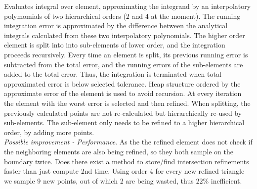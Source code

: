\documentclass[12pt]{article}
\begin{document}
Evaluates integral over element, approximating the integrand by an interpolatory polymomials of two hierarchical orders (2 and 4 at the moment). The running integration error is approximated by the difference between the analytical integrals calculated from these two interpolatory polynomials. The higher order element is split into into sub-elements of lower order, and the integration proceeds recursively. Every time an element is split, its previous running error is subtracted from the total error, and the running errors of the sub-elements are added to the total error. Thus, the integration is terminated when total approximated error is below selected tolerance. Heap structure ordered by the approximate error of the element is used to avoid recursion. At every iteration the element with the worst error is selected and then refined. When splitting, the previously calculated points are not re-calculated but hierarchically re-used by sub-elements. The sub-element only needs to be refined to a higher hierarchical order, by adding more points. \\

\noindent
\textit{Possible improvement - Performance}. As the the refined element does not check if the neighboring elements are also being refined, so they both sample on the boundary twice. Does there exist a method to store/find intersection refinements faster than just compute 2nd time. Using order 4 for every new refined triangle we sample 9 new points, out of which 2 are being wasted, thus $22\%$ inefficient.
\end{document}
